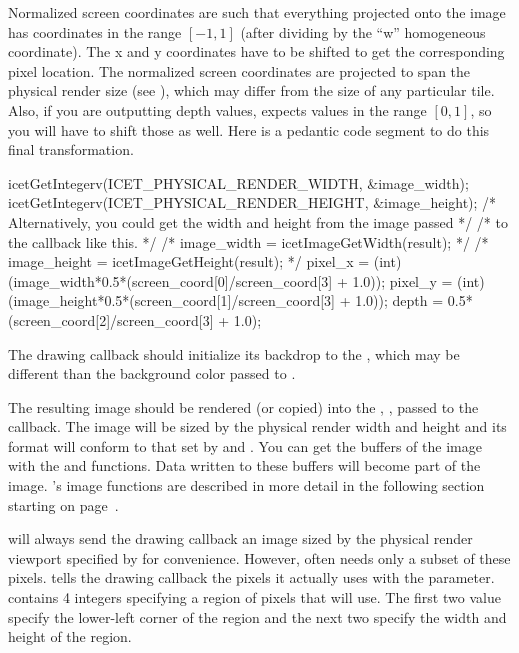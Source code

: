 Normalized screen coordinates are such that everything projected onto the
image has coordinates in the range $[-1,1]$ (after dividing by the ``w''
homogeneous coordinate).  The x and y coordinates have to be shifted to get
the corresponding pixel location.  The normalized screen coordinates are
projected to span the physical render size (see
), which may differ from the size of any
particular tile.  Also, if you are outputting depth values, \IceT expects
values in the range $[0,1]$, so you will have to shift those as well.  Here
is a pedantic code segment to do this final transformation.

\begin{code}
icetGetIntegerv(ICET_PHYSICAL_RENDER_WIDTH, &image_width);
icetGetIntegerv(ICET_PHYSICAL_RENDER_HEIGHT, &image_height);
/* Alternatively, you could get the width and height from the image passed */
/* to the callback like this.                                              */
/* image_width = icetImageGetWidth(result);                                */
/* image_height = icetImageGetHeight(result);                              */
pixel_x = (int)(image_width*0.5*(screen_coord[0]/screen_coord[3] + 1.0));
pixel_y = (int)(image_height*0.5*(screen_coord[1]/screen_coord[3] + 1.0));
depth = 0.5*(screen_coord[2]/screen_coord[3] + 1.0);
\end{code}

The drawing callback should initialize its backdrop to the
, which may be different than the background color
passed to .

The resulting image should be rendered (or copied) into the
, , passed to the callback.  The image will
be sized by the physical render width and height and its format will
conform to that set by  and
.  You can get the buffers of the image with the
\icetImageGetColor and \icetImageGetDepth functions.  Data written to these
buffers will become part of the image.  \IceT's image functions are
described in more detail in the following section starting on
page~\pageref{sec:Basic_Usage:Image_Objects}.

\IceT will always send the drawing callback an image sized by the physical
render viewport specified by  for
convenience.  However, \IceT often needs only a subset of these pixels.
\IceT tells the drawing callback the pixels it actually uses with the
 parameter.   contains 4
integers specifying a region of pixels that \IceT will use.  The first two
value specify the lower-left corner of the region and the next two specify
the width and height of the region.

